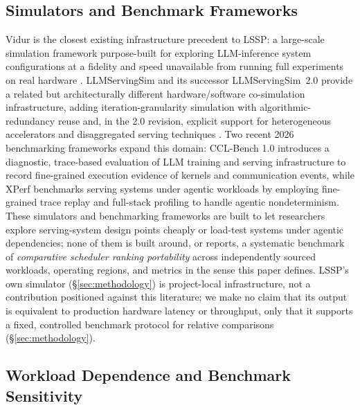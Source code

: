 \subsection{Simulators and Benchmark Frameworks}
\label{sec:related-simulators}

Vidur is the closest existing infrastructure precedent to LSSP: a
large-scale simulation framework purpose-built for exploring LLM-inference
system configurations at a fidelity and speed unavailable from
running full experiments on real hardware \citep{vidur2024}. LLMServingSim
and its successor LLMServingSim~2.0 provide a related but architecturally
different hardware/software co-simulation infrastructure, adding
iteration-granularity simulation with algorithmic-redundancy reuse and,
in the 2.0 revision, explicit support for heterogeneous accelerators and
disaggregated serving techniques \citep{llmservingsim2024,llmservingsim2_2025}.
Two recent 2026 benchmarking frameworks expand this domain: CCL-Bench 1.0
\citep{ding2026cclbench} introduces a diagnostic, trace-based evaluation
of LLM training and serving infrastructure to record fine-grained execution
evidence of kernels and communication events, while XPerf \citep{wang2026xperf}
benchmarks serving systems under agentic workloads by employing fine-grained
trace replay and full-stack profiling to handle agentic nondeterminism.
These simulators and benchmarking frameworks are built to let researchers
explore serving-system design points cheaply or load-test systems under
agentic dependencies; none of them is built around, or reports, a systematic
benchmark of \emph{comparative scheduler ranking portability} across
independently sourced workloads, operating regions, and metrics in the sense
this paper defines. LSSP's own simulator (\S\ref{sec:methodology}) is
project-local infrastructure, not a contribution positioned against this
literature; we make no claim that its output is equivalent to production
hardware latency or throughput, only that it supports a fixed, controlled
benchmark protocol for relative comparisons (\S\ref{sec:methodology}).

\subsection{Workload Dependence and Benchmark Sensitivity}
\label{sec:related-dependence}

